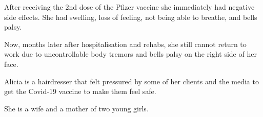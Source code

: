 After receiving the 2nd dose of the Pfizer vaccine she immediately had negative
side effects. She had swelling, loss of feeling, not being able to breathe, and
bells palsy.

Now, months later after hospitalisation and rehabs, she still cannot return to
work due to uncontrollable body tremors and bells palsy on the right side of her
face.

Alicia is a hairdresser that felt pressured by some of her clients and the media
to get the Covid-19 vaccine to make them feel safe.

She is a wife and a mother of two young girls.

